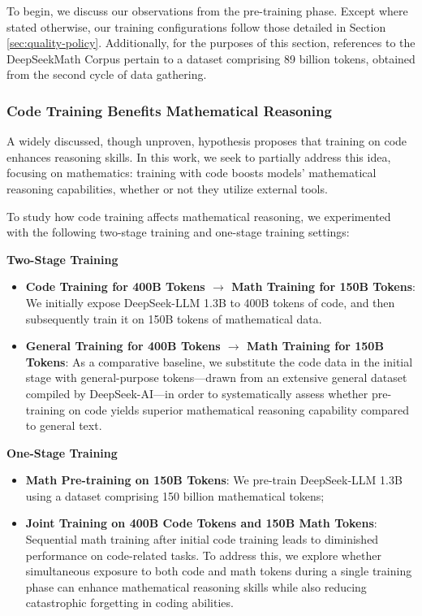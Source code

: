 \begin{itemize}[topsep=0pt]
\begin{itemize}[topsep=0pt]
To begin, we discuss our observations from the pre-training phase. Except where stated otherwise, our training configurations follow those detailed in Section \ref{sec:quality-policy}. Additionally, for the purposes of this section, references to the DeepSeekMath Corpus pertain to a dataset comprising 89 billion tokens, obtained from the second cycle of data gathering.

\subsubsection{Code Training Benefits Mathematical Reasoning}

A widely discussed, though unproven, hypothesis proposes that training on code enhances reasoning skills. In this work, we seek to partially address this idea, focusing on mathematics: training with code boosts models' mathematical reasoning capabilities, whether or not they utilize external tools.

To study how code training affects mathematical reasoning, we experimented with the following two-stage training and one-stage training settings:

\textbf{Two-Stage Training}

\begin{itemize}[topsep=0pt]
    \item \textbf{Code Training for 400B Tokens $\rightarrow$ Math Training for 150B Tokens}: We initially expose DeepSeek-LLM 1.3B to 400B tokens of code, and then subsequently train it on 150B tokens of mathematical data.
    \item \textbf{General Training for 400B Tokens $\rightarrow$ Math Training for 150B Tokens}: As a comparative baseline, we substitute the code data in the initial stage with general-purpose tokens—drawn from an extensive general dataset compiled by DeepSeek-AI—in order to systematically assess whether pre-training on code yields superior mathematical reasoning capability compared to general text.
\end{itemize}

\textbf{One-Stage Training}

\begin{itemize}[topsep=0pt]
    \item \textbf{Math Pre-training on 150B Tokens}: We pre-train DeepSeek-LLM 1.3B using a dataset comprising 150 billion mathematical tokens;
    \item \textbf{Joint Training on 400B Code Tokens and 150B Math Tokens}: Sequential math training after initial code training leads to diminished performance on code-related tasks. To address this, we explore whether simultaneous exposure to both code and math tokens during a single training phase can enhance mathematical reasoning skills while also reducing catastrophic forgetting in coding abilities.
\end{itemize}


\end{itemize}
\end{itemize}
